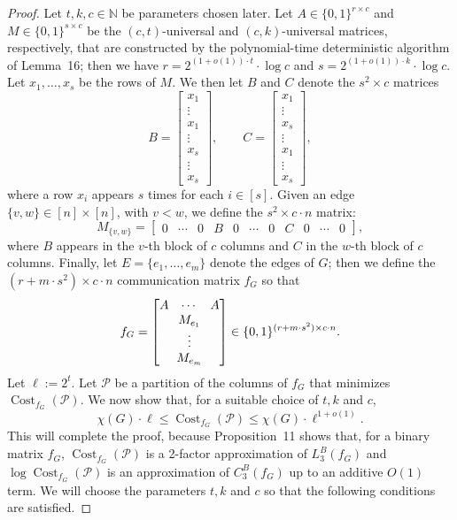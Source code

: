 \begin{proof}
Let $t,k,c\in\mathbb N$ be parameters chosen later. Let $A\in\{0,1\}^{r\times c}$ and $M\in\{0,1\}^{s\times c}$ be the $(c,t)$-universal and $(c,k)$-universal matrices, respectively, that are constructed by the polynomial-time deterministic algorithm of Lemma~16; then we have $r=2^{(1+o(1))\cdot t}\cdot\log c$ and $s=2^{(1+o(1))\cdot k}\cdot\log c$.
Let $x_1,\ldots,x_s$ be the rows of $M$. We then let $B$ and $C$ denote the $s^2\times c$ matrices
\[
B=\begin{bmatrix}x_1\\\vdots\\x_1\\\vdots\\x_s\\\vdots\\x_s\end{bmatrix},\qquad
C=\begin{bmatrix}x_1\\\vdots\\x_s\\\vdots\\x_1\\\vdots\\x_s\end{bmatrix},
\]
where a row $x_i$ appears $s$ times for each $i\in[s]$. Given an edge $\{v,w\}\in[n]\times[n]$, with $v<w$, we define the $s^2\times c\cdot n$ matrix:
\[M_{\{v,w\}}=\begin{bmatrix}0&\cdots&0&B&0&\cdots&0&C&0&\cdots&0\end{bmatrix},\]
where $B$ appears in the $v$-th block of $c$ columns and $C$ in the $w$-th block of $c$ columns. Finally, let $E=\{e_1,\ldots,e_m\}$ denote the edges of $G$; then we define the $(r+m\cdot s^2)\times c\cdot n$ communication matrix $f_G$ so that
\[f_G=\begin{bmatrix}A&\cdots&A\\\multicolumn{3}{c}{M_{e_1}}\\\multicolumn{3}{c}{\vdots}\\\multicolumn{3}{c}{M_{e_m}}\end{bmatrix}\in\{0,1\}^{(r+m\cdot s^2)\times c\cdot n}.\]
Let $\ell:=2^t$. Let $\mathcal P$ be a partition of the columns of $f_G$ that minimizes $\operatorname{Cost}_{f_G}(\mathcal P)$. We now show that, for a suitable choice of $t,k$ and $c$,
\[\chi(G)\cdot\ell\le\operatorname{Cost}_{f_G}(\mathcal P)\le\chi(G)\cdot\ell^{1+o(1)}.\]
This will complete the proof, because Proposition~11 shows that, for a binary matrix $f_G$, $\operatorname{Cost}_{f_G}(\mathcal P)$ is a 2-factor approximation of $L_3^B(f_G)$ and $\log\operatorname{Cost}_{f_G}(\mathcal P)$ is an approximation of $C_3^B(f_G)$ up to an additive $O(1)$ term. We will choose the parameters $t,k$ and $c$ so that the following conditions are satisfied.

\end{proof}
